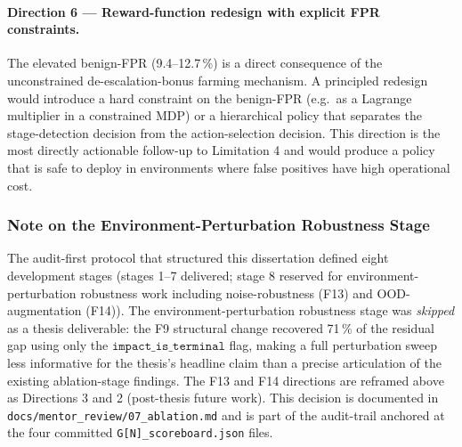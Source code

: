 \paragraph{Direction 6 --- Reward-function redesign with explicit FPR constraints.} The elevated benign-FPR (9.4--12.7\,\%) is a direct consequence of the unconstrained de-escalation-bonus farming mechanism. A principled redesign would introduce a hard constraint on the benign-FPR (e.g.\ as a Lagrange multiplier in a constrained MDP) or a hierarchical policy that separates the stage-detection decision from the action-selection decision. This direction is the most directly actionable follow-up to Limitation 4 and would produce a policy that is safe to deploy in environments where false positives have high operational cost.

\subsubsection{Note on the Environment-Perturbation Robustness Stage}
The audit-first protocol that structured this dissertation defined eight development stages (stages 1--7 delivered; stage 8 reserved for environment-perturbation robustness work including noise-robustness (F13) and OOD-augmentation (F14)). The environment-perturbation robustness stage was \emph{skipped} as a thesis deliverable: the F9 structural change recovered 71\,\% of the residual gap using only the $\texttt{impact\_is\_terminal}$ flag, making a full perturbation sweep less informative for the thesis's headline claim than a precise articulation of the existing ablation-stage findings. The F13 and F14 directions are reframed above as Directions 3 and 2 (post-thesis future work). This decision is documented in \texttt{docs/mentor\_review/07\_ablation.md} and is part of the audit-trail anchored at the four committed \texttt{G[N]\_scoreboard.json} files.
